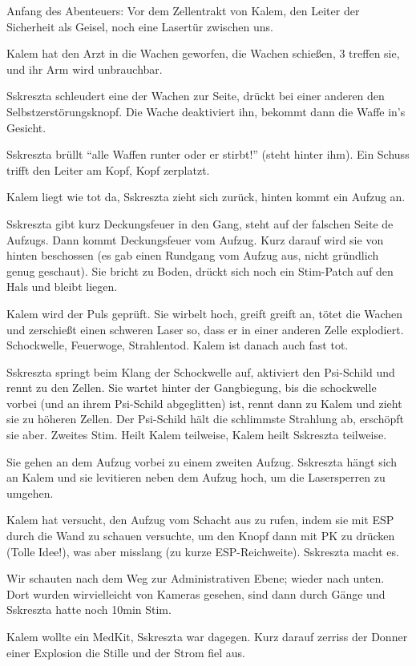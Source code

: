 \documentclass[11pt]{scrartcl}
\begin{document}
Anfang des Abenteuers: Vor dem Zellentrakt von Kalem, den Leiter der
Sicherheit als Geisel, noch eine Lasertür zwischen uns.

Kalem hat den Arzt in die Wachen geworfen, die Wachen schießen, 3
treffen sie, und ihr Arm wird unbrauchbar.

Sskreszta schleudert eine der Wachen zur Seite, drückt bei einer anderen
den Selbstzerstörungsknopf. Die Wache deaktiviert ihn, bekommt dann die
Waffe in's Gesicht.

Sskreszta brüllt ``alle Waffen runter oder er stirbt!'' (steht hinter
ihm). Ein Schuss trifft den Leiter am Kopf, Kopf zerplatzt.

Kalem liegt wie tot da, Sskreszta zieht sich zurück, hinten kommt ein
Aufzug an.

Sskreszta gibt kurz Deckungsfeuer in den Gang, steht auf der falschen
Seite de Aufzugs. Dann kommt Deckungsfeuer vom Aufzug. Kurz darauf wird
sie von hinten beschossen (es gab einen Rundgang vom Aufzug aus, nicht
gründlich genug geschaut). Sie bricht zu Boden, drückt sich noch ein
Stim-Patch auf den Hals und bleibt liegen.

Kalem wird der Puls geprüft. Sie wirbelt hoch, greift greift an, tötet
die Wachen und zerschießt einen schweren Laser so, dass er in einer
anderen Zelle explodiert. Schockwelle, Feuerwoge, Strahlentod. Kalem ist
danach auch fast tot.

Sskreszta springt beim Klang der Schockwelle auf, aktiviert den
Psi-Schild und rennt zu den Zellen. Sie wartet hinter der Gangbiegung,
bis die schockwelle vorbei (und an ihrem Psi-Schild abgeglitten) ist,
rennt dann zu Kalem und zieht sie zu höheren Zellen. Der Psi-Schild hält
die schlimmste Strahlung ab, erschöpft sie aber. Zweites Stim. Heilt
Kalem teilweise, Kalem heilt Sskreszta teilweise.

Sie gehen an dem Aufzug vorbei zu einem zweiten Aufzug. Sskreszta hängt
sich an Kalem und sie levitieren neben dem Aufzug hoch, um die
Lasersperren zu umgehen.

Kalem hat versucht, den Aufzug vom Schacht aus zu rufen, indem sie mit
ESP durch die Wand zu schauen versuchte, um den Knopf dann mit PK zu
drücken (Tolle Idee!), was aber misslang (zu kurze ESP-Reichweite).
Sskreszta macht es.

Wir schauten nach dem Weg zur Administrativen Ebene; wieder nach unten.
Dort wurden wirvielleicht von Kameras gesehen, sind dann durch Gänge und
Sskreszta hatte noch 10min Stim.

Kalem wollte ein MedKit, Sskreszta war dagegen. Kurz darauf zerriss der
Donner einer Explosion die Stille und der Strom fiel aus.
\end{document}
